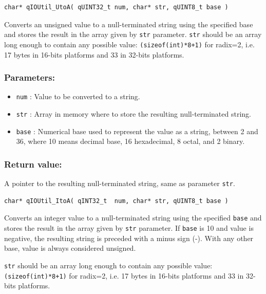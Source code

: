 \documentclass{article}
\begin{document}
\noindent\hrulefill

\begin{lstlisting}[style=CStyle]
char* qIOUtil_UtoA( qUINT32_t num, char* str, qUINT8_t base )
\end{lstlisting}

Converts an unsigned value to a null-terminated string using the specified base and stores the result in the array given by \lstinline{str} parameter. \lstinline{str} should be an array long enough to contain any possible value: \lstinline{(sizeof(int)*8+1)} for radix=2, i.e. 17 bytes in 16-bits platforms and 33 in 32-bits platforms. 

\subsubsection*{Parameters:}
\begin{itemize}
    \item \lstinline{num} : Value to be converted to a string.
    \item \lstinline{str} : Array in memory where to store the resulting null-terminated string.
    \item \lstinline{base} : Numerical base used to represent the value as a string, between 2 and 36, where 10 means decimal base, 16 hexadecimal, 8 octal, and 2 binary.
\end{itemize}

\subsubsection*{Return value:}
A pointer to the resulting null-terminated string, same as parameter \lstinline{str}.


\noindent\hrulefill

\begin{lstlisting}[style=CStyle]
char* qIOUtil_ItoA( qINT32_t  num, char* str, qUINT8_t base )
\end{lstlisting}

Converts an integer value to a null-terminated string using the specified \lstinline{base} and stores the result in the array given by \lstinline{str} parameter. If \lstinline{base} is 10 and value is negative, the resulting string is preceded with a minus sign (-). With any other base, value is always considered unsigned. 

\lstinline{str} should be an array long enough to contain any possible value: \lstinline{(sizeof(int)*8+1)} for radix=2, i.e. 17 bytes in 16-bits platforms and 33 in 32-bits platforms.
\end{document}
